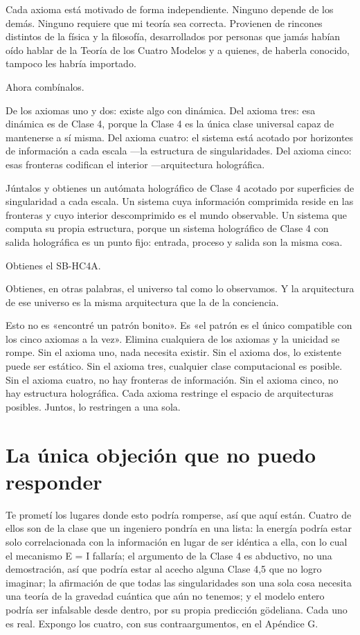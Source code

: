 \documentclass[11pt, twoside, openright]{book}
\begin{document}
Cada axioma está motivado de forma independiente. Ninguno depende de los demás. Ninguno requiere que mi teoría sea correcta. Provienen de rincones distintos de la física y la filosofía, desarrollados por personas que jamás habían oído hablar de la Teoría de los Cuatro Modelos y a quienes, de haberla conocido, tampoco les habría importado.

Ahora combínalos.

De los axiomas uno y dos: existe algo con dinámica. Del axioma tres: esa dinámica es de Clase 4, porque la Clase 4 es la única clase universal capaz de mantenerse a sí misma. Del axioma cuatro: el sistema está acotado por horizontes de información a cada escala ---la estructura de singularidades. Del axioma cinco: esas fronteras codifican el interior ---arquitectura holográfica.

Júntalos y obtienes un autómata holográfico de Clase 4 acotado por superficies de singularidad a cada escala. Un sistema cuya información comprimida reside en las fronteras y cuyo interior descomprimido es el mundo observable. Un sistema que computa su propia estructura, porque un sistema holográfico de Clase 4 con salida holográfica es un punto fijo: entrada, proceso y salida son la misma cosa.

Obtienes el SB-HC4A.

Obtienes, en otras palabras, el universo tal como lo observamos. Y la arquitectura de ese universo es la misma arquitectura que la de la conciencia.

Esto no es «encontré un patrón bonito». Es «el patrón es el único compatible con los cinco axiomas a la vez». Elimina cualquiera de los axiomas y la unicidad se rompe. Sin el axioma uno, nada necesita existir. Sin el axioma dos, lo existente puede ser estático. Sin el axioma tres, cualquier clase computacional es posible. Sin el axioma cuatro, no hay fronteras de información. Sin el axioma cinco, no hay estructura holográfica. Cada axioma restringe el espacio de arquitecturas posibles. Juntos, lo restringen a una sola.

\section*{La única objeción que no puedo responder}

Te prometí los lugares donde esto podría romperse, así que aquí están. Cuatro de ellos son de la clase que un ingeniero pondría en una lista: la energía podría estar solo correlacionada con la información en lugar de ser idéntica a ella, con lo cual el mecanismo E = I fallaría; el argumento de la Clase 4 es abductivo, no una demostración, así que podría estar al acecho alguna Clase 4,5 que no logro imaginar; la afirmación de que todas las singularidades son una sola cosa necesita una teoría de la gravedad cuántica que aún no tenemos; y el modelo entero podría ser infalsable desde dentro, por su propia predicción gödeliana. Cada uno es real. Expongo los cuatro, con sus contraargumentos, en el Apéndice G.
\end{document}
